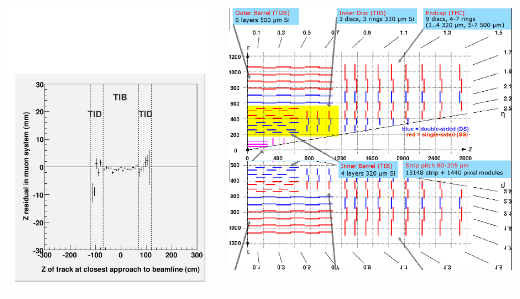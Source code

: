 \documentclass[compress]{beamer}
\begin{document}
\begin{frame}
\begin{columns}
\includegraphics[width=\linewidth]{zresid_from_tracker_innertop.pdf}

\includegraphics[width=\linewidth]{tracker_map_innertop.png}


\end{columns}
\end{frame}
\end{document}
